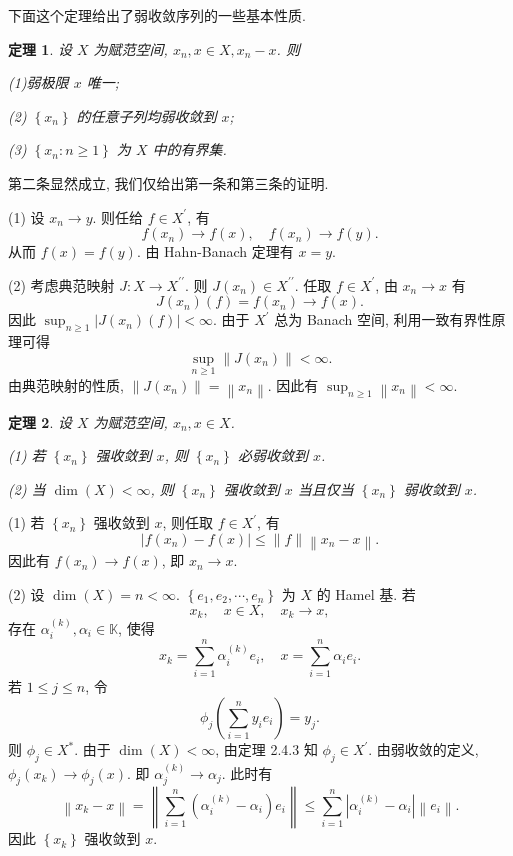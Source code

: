 \documentclass[openany]{ctexbook}
\makeatletter
\theoremstyle{kaiti}
\newtheorem{theorem}{定理}[section]
\theoremstyle{normal}
\renewenvironment{proof}[1][\proofname]{\par
    \pushQED{\qed}%
    \normalfont \topsep6\p@\@plus6\p@\relax
    \trivlist
    \item\relax
    {\heiti #1}\hspace{2\labelsep}\ignorespaces
  }{%
    \popQED\endtrivlist\@endpefalse
  }
\makeatother
\begin{document}
下面这个定理给出了弱收敛序列的一些基本性质.

\begin{theorem}
设 $X$ 为赋范空间, $x_n, x \in X, x_n-x$. 则

(1)弱极限 $x$ 唯一;

(2) $\left\{x_n\right\}$ 的任意子列均弱收敛到 $x$;

(3) $\left\{x_n: n \geqslant 1\right\}$ 为 $X$ 中的有界集.
\end{theorem}

\begin{proof}
第二条显然成立, 我们仅给出第一条和第三条的证明.

(1) 设 $x_n \rightarrow y$. 则任给 $f \in X^{\prime}$, 有
$$
f\left(x_n\right) \rightarrow f(x), \quad f\left(x_n\right) \rightarrow f(y).
$$
从而 $f(x)=f(y)$. 由 Hahn-Banach 定理有 $x=y$.

(2) 考虑典范映射 $J: X \rightarrow X^{\prime \prime}$. 则 $J\left(x_n\right) \in X^{\prime \prime}$. 任取 $f \in X^{\prime}$, 由 $x_n \rightarrow x$ 有
$$
J\left(x_n\right)(f)=f\left(x_n\right) \rightarrow f(x).
$$
因此 $\sup_{n \geqslant 1}\left|J\left(x_n\right)(f)\right|<\infty$. 由于 $X^{\prime}$ 总为 Banach 空间, 利用一致有界性原理可得 
$$
\sup_{n \geqslant 1}\left\|J\left(x_n\right)\right\|<\infty.
$$
由典范映射的性质, $\left\|J\left(x_n\right)\right\|=\left\|x_n\right\|$. 因此有 $\sup_{n \geqslant 1}\left\|x_n\right\|<\infty$.
\end{proof}

\begin{theorem}
设 $X$ 为赋范空间, $x_n, x \in X$.

(1) 若 $\left\{x_n\right\}$ 强收敛到 $x$, 则 $\left\{x_n\right\}$ 必弱收敛到 $x$.

(2) 当 $\operatorname{dim}(X)<\infty$, 则 $\left\{x_n\right\}$ 强收敛到 $x$ 当且仅当 $\left\{x_n\right\}$ 弱收敛到 $x$.
\end{theorem}

\begin{proof}
(1) 若 $\left\{x_n\right\}$ 强收敛到 $x$, 则任取 $f \in X^{\prime}$, 有
$$
\left|f\left(x_n\right)-f(x)\right| \leqslant\|f\|\left\|x_n-x\right\|.
$$
因此有 $f\left(x_n\right) \rightarrow f(x)$, 即 $x_n \rightarrow x$.

(2) 设 $\operatorname{dim}(X)=n<\infty$. $\left\{e_1, e_2, \cdots, e_n\right\}$ 为 $X$ 的 Hamel 基. 若
$$
x_{k}, \quad x \in X, \quad x_{k} \rightarrow x,
$$
存在 $\alpha_{i}^{(k)}, \alpha_{i} \in \mathbb{K}$, 使得
$$
x_{k}=\sum_{i=1}^n \alpha_{i}^{(k)} e_{i}, \quad x=\sum_{i=1}^n \alpha_{i} e_{i}.
$$
若 $1 \leqslant j \leqslant n$, 令
$$
\phi_{j}\left(\sum_{i=1}^n y_{i} e_{i}\right)=y_{j}.
$$
则 $\phi_{j} \in X^{*}$. 由于 $\operatorname{dim}(X)<\infty$, 由定理 2.4.3 知 $\phi_{j} \in X^{\prime}$. 由弱收敛的定义, $\phi_{j}\left(x_{k}\right) \rightarrow \phi_{j}(x)$. 即 $\alpha_{j}^{(k)} \rightarrow \alpha_{j}$. 此时有
$$
\left\|x_{k}-x\right\|=\left\|\sum_{i=1}^n\left(\alpha_{i}^{(k)}-\alpha_{i}\right) e_{i}\right\| \leqslant \sum_{i=1}^n\left|\alpha_{i}^{(k)}-\alpha_{i}\right|\left\|e_{i}\right\|.
$$
因此 $\left\{x_{k}\right\}$ 强收敛到 $x$.
\end{proof}
\end{document}
